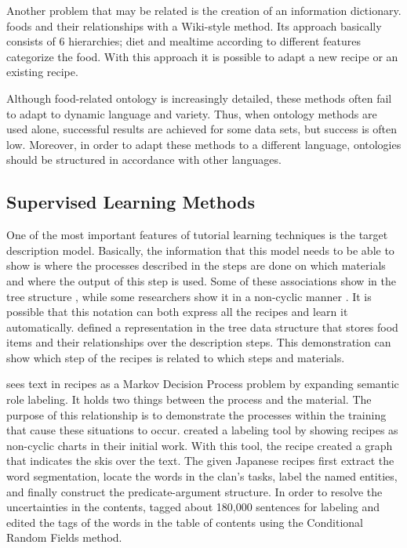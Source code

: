 Another problem that may be related is the creation of an information dictionary. \cite{gaillard2012interactive} foods and their relationships with a Wiki-style method. Its approach basically consists of 6 hierarchies; diet and mealtime according to different features categorize the food. With this approach it is possible to adapt a new recipe or an existing recipe.

Although food-related ontology is increasingly detailed, these methods often fail to adapt to dynamic language and variety. Thus, when ontology methods are used alone, successful results are achieved for some data sets, but success is often low. Moreover, in order to adapt these methods to a different language, ontologies should be structured in accordance with other languages.


\subsection{Supervised Learning Methods}
One of the most important features of tutorial learning techniques is the target description model. Basically, the information that this model needs to be able to show is where the processes described in the steps are done on which materials and where the output of this step is used. Some of these associations show in the tree structure \cite{jermsura}, while some researchers show it in a non-cyclic manner \cite{malmaud2014cooking}. It is possible that this notation can both express all the recipes and learn it automatically.
\cite{jermsura} defined a representation in the tree data structure that stores food items and their relationships over the description steps. This demonstration can show which step of the recipes is related to which steps and materials.

\cite{malmaud2014cooking} sees text in recipes as a Markov Decision Process problem by expanding semantic role labeling. It holds two things between the process and the material. The purpose of this relationship is to demonstrate the processes within the training that cause these situations to occur.
\cite{mori2014flow} created a labeling tool by showing recipes as non-cyclic charts in their initial work. With this tool, the recipe created a graph that indicates the skis over the text. The given Japanese recipes first extract the word segmentation, locate the words in the clan's tasks, label the named entities, and finally construct the predicate-argument structure.
In order to resolve the uncertainties in the contents, \cite{greene} tagged about 180,000 sentences for labeling and edited the tags of the words in the table of contents using the Conditional Random Fields method.



